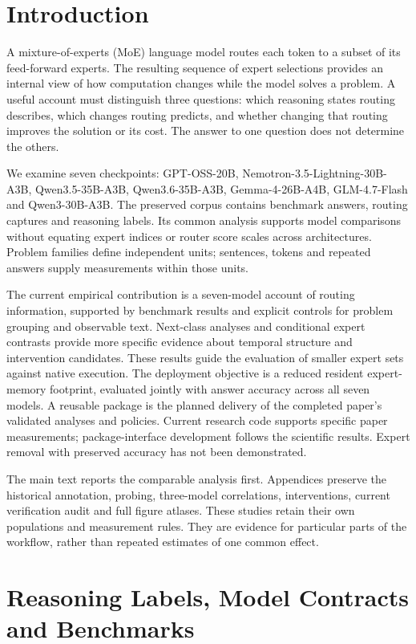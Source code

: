 \section{Introduction}

A mixture-of-experts (MoE) language model routes each token to a subset of
its feed-forward experts. The resulting sequence of expert selections
provides an internal view of how computation changes while the model
solves a problem. A useful account must distinguish three questions:
which reasoning states routing describes, which changes routing predicts,
and whether changing that routing improves the solution or its cost.
The answer to one question does not determine the others.

We examine seven checkpoints: GPT-OSS-20B, Nemotron-3.5-Lightning-30B-A3B,
Qwen3.5-35B-A3B, Qwen3.6-35B-A3B, Gemma-4-26B-A4B,
GLM-4.7-Flash and Qwen3-30B-A3B. The preserved corpus contains benchmark
answers, routing captures and reasoning labels. Its common analysis
supports model comparisons without equating expert indices or router
score scales across architectures. Problem families define independent
units; sentences, tokens and repeated answers supply measurements within
those units.

The current empirical contribution is a seven-model account of routing
information, supported by benchmark results and explicit controls for
problem grouping and observable text. Next-class analyses and conditional
expert contrasts provide more specific evidence about temporal structure
and intervention candidates. These results guide the evaluation of
smaller expert sets against native execution. The deployment objective is
a reduced resident expert-memory footprint, evaluated jointly with answer
accuracy across all seven models. A reusable package is the planned
delivery of the completed paper's validated analyses and policies. Current
research code supports specific paper measurements; package-interface
development follows the scientific results. Expert removal with
preserved accuracy has not been demonstrated.

The main text reports the comparable analysis first. Appendices preserve
the historical annotation, probing, three-model correlations, interventions,
current verification audit and full figure atlases. These studies retain
their own populations and measurement rules. They are evidence for
particular parts of the workflow, rather than repeated estimates of one
common effect.

\section{Reasoning Labels, Model Contracts and Benchmarks}
\label{sec:analysis-design}


